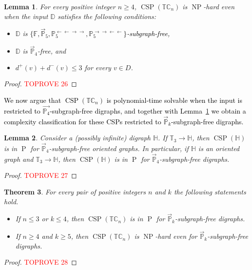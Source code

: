 \documentclass{article}
\newtheorem{theorem}{Theorem}
\newtheorem{lemma}[theorem]{Lemma}
\theoremstyle{definition}
\theoremstyle{remark}
\newcommand{\blue}[1]{\textcolor{black}{#1}}
\DeclareMathOperator{\NP}{NP}
\DeclareMathOperator{\cP}{P}
\DeclareMathOperator{\CSP}{CSP}
\newcommand{\bC}{{\mathbb C}}
\newcommand{\bD}{{\mathbb D}}
\newcommand{\bF}{{\mathbb F}}
\newcommand{\bH}{{\mathbb H}}
\newcommand{\bP}{{\mathbb P}}
\newcommand{\bT}{{\mathbb T}}
\begin{document}
\begin{lemma}\label{lem:TCkxTTk}
    For every positive integer $n\ge 4$, $\CSP(\bT\bC_n)$ is $\NP$-hard even when the input
    $\bD$ satisfies the following conditions:
    \begin{itemize}
        \item $\bD$ is \blue{$\{\bF,\vec{\bP}_5,\bP_5^{\leftarrow\leftarrow\to\to},\bP_5^{\to\to\leftarrow\leftarrow}\}$-subgraph-free,} 
        \item $\bD$ is $\vec{\bP}_4$-free, and
        \item $d^+(v) + d^-(v) \le 3$ for every $v\in D$.
    \end{itemize}
\end{lemma}
\begin{proof}\textcolor{red}{TOPROVE 26}\end{proof}


\blue{We now argue that $\CSP(\bT\bC_n)$ is polynomial-time solvable
when the input is restricted to $\vec{\bP_4}$-subgraph-free digraphs, and together
with Lemma~\ref{lem:TCkxTTk} we obtain a complexity classification for
these CSPs restricted to $\vec{\bP}_k$-subgraph-free digraphs.}

\begin{lemma}\label{lem:oriented-P4-subgraph-free}
    Consider a (possibly infinite) digraph $\bH$. If $\bT_3\to \bH$, then $\CSP(\bH)$ is in
    $\cP$ for $\vec{\bP}_4$-subgraph-free oriented graphs. In particular, 
    if $\bH$ is an oriented graph and $\bT_3\to \bH$, then $\CSP(\bH)$ is in
    $\cP$ for $\vec{\bP}_4$-subgraph-free digraphs.
\end{lemma}
\begin{proof}\textcolor{red}{TOPROVE 27}\end{proof}

\begin{theorem}\label{thm:TCn-Pk-subgraph-classification}
    For every pair of positive integers $n$ and $k$ the following statements hold.
    \begin{itemize}
        \item If $n \le 3$ or $k\le 4$, then $\CSP(\bT\bC_n)$ is in $\cP$ for $\vec{\bP}_k$-subgraph-free
        digraphs.
        \item If $n \ge 4$ and $k \ge 5$, then $\CSP(\bT\bC_n)$ is $\NP$-hard even for
        $\vec{\bP}_k$-subgraph-free digraphs.
    \end{itemize}
\end{theorem}
\begin{proof}\textcolor{red}{TOPROVE 28}\end{proof}
\end{document}
